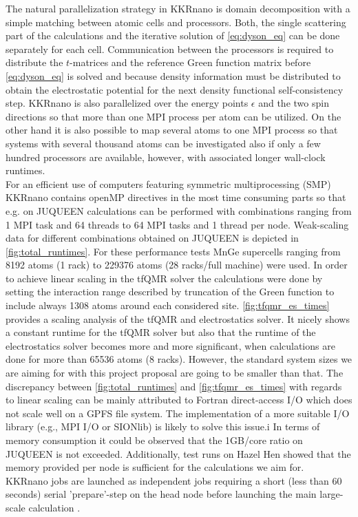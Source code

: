 \documentclass [a4paper, 12pt]{article}
\begin{document}
The natural parallelization strategy in KKRnano is domain decomposition with a simple 
matching between atomic cells and processors. Both, the single scattering part of the 
calculations and the iterative solution of \cref{eq:dyson_eq} can be done separately for each cell. 
Communication between the processors is required to distribute the $t$-matrices and the 
reference Green function matrix before \cref{eq:dyson_eq} is solved and because density information
must be distributed to obtain the electrostatic potential for the next density functional
self-consistency step. KKRnano is also parallelized over the energy points $\epsilon$ and 
the two spin directions so that more than one MPI process per atom can be utilized.
On the other hand it is also possible to map several atoms to one MPI process so that
systems with several thousand atoms can be investigated also if only a few hundred
processors are available, however, with associated longer wall-clock runtimes.
\\
For an efficient use of computers featuring symmetric multiprocessing (SMP) KKRnano contains openMP directives
in the most time consuming parts so that e.g. on JUQUEEN calculations can be performed with combinations 
ranging from 1 MPI task and 64 threads to 64 MPI tasks and 1 thread per node. Weak-scaling data
for different combinations
obtained on JUQUEEN is depicted in \cref{fig:total_runtimes}. For these performance tests MnGe supercells
ranging from 8192 atoms (1 rack) to 229376 atoms (28 racks/full machine) were used.
In order to achieve linear scaling in the tfQMR solver the calculations were 
done by setting the interaction range described by truncation of the Green function to include 
always 1308 atoms around each considered site.
\cref{fig:tfqmr_es_times} provides a scaling analysis of the tfQMR and electrostatics solver. It nicely shows 
a constant runtime for the tfQMR solver but also that the runtime of the electrostatics solver becomes
more and more significant, when calculations are done for more than 65536 atoms (8 racks). 
However, the standard system sizes we are aiming
for with this project proposal are going to be smaller than that.
The discrepancy between \cref{fig:total_runtimes} and \cref{fig:tfqmr_es_times} with regards to linear
scaling can be mainly attributed to Fortran direct-access I/O which does not scale well on a GPFS file system.
The implementation of a more suitable I/O library (e.g., MPI I/O or SIONlib) is likely to solve this issue.i
In terms of memory consumption it could be observed that the 1GB/core ratio on JUQUEEN is not exceeded.
Additionally, test runs on Hazel Hen showed that the memory provided per node is sufficient for the calculations
we aim for.
\\
KKRnano jobs are launched as independent jobs requiring a short (less than 60 seconds) serial 'prepare'-step on
the head node
before launching the main large-scale calculation .
\end{document}
